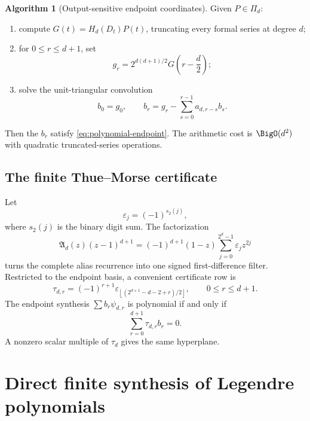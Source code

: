 \documentclass[11pt,oneside]{article}
\theoremstyle{definition}
\newtheorem{algorithm}[theorem]{Algorithm}
\theoremstyle{remark}
\newcommand{\eps}{\varepsilon}
\begin{document}
\begin{algorithm}[Output-sensitive endpoint coordinates]
\label{alg:endpoint}
Given $P\in\Pi_d$:
\begin{enumerate}
\item compute $G(t)=H_d(D_t)P(t)$, truncating every formal series at degree
$d$;
\item for $0\le r\le d+1$, set
\begin{equation}
 g_r=2^{d(d+1)/2}G\!\left(r-\frac d2\right);
 \label{eq:g-r}
\end{equation}
\item solve the unit-triangular convolution
\begin{equation}
 b_0=g_0,
 \qquad
 b_r=g_r-\sum_{s=0}^{r-1}a_{d,r-s}b_s.
 \label{eq:b-triangular}
\end{equation}
\end{enumerate}
Then the $b_r$ satisfy \eqref{eq:polynomial-endpoint}.  The arithmetic cost is
$\BigO(d^2)$ with quadratic truncated-series operations.
\end{algorithm}

\subsection{The finite Thue--Morse certificate}
Let
\begin{equation}
 \eps_j=(-1)^{s_2(j)},
 \label{eq:tm-sign}
\end{equation}
where $s_2(j)$ is the binary digit sum.  The factorization
\begin{equation}
 \mathfrak A_d(z)(z-1)^{d+1}
 =(-1)^{d+1}(1-z)\sum_{j=0}^{2^d-1}\eps_jz^{2j}
 \label{eq:tm-factor}
\end{equation}
turns the complete alias recurrence into one signed first-difference filter.
Restricted to the endpoint basis, a convenient certificate row is
\begin{equation}
 \boxed{
 \tau_{d,r}=(-1)^{r+1}
 \eps_{\left\lfloor(2^{d+1}-d-2+r)/2\right\rfloor},
 \qquad0\le r\le d+1.}
 \label{eq:tau-row}
\end{equation}
The endpoint synthesis $\sum b_r\psi_{d,r}$ is polynomial if and only if
\begin{equation}
 \sum_{r=0}^{d+1}\tau_{d,r}b_r=0.
 \label{eq:tau-poly}
\end{equation}
A nonzero scalar multiple of $\tau_d$ gives the same hyperplane.

\section{Direct finite synthesis of Legendre polynomials}
\label{sec:legendre-synthesis}
\end{document}
